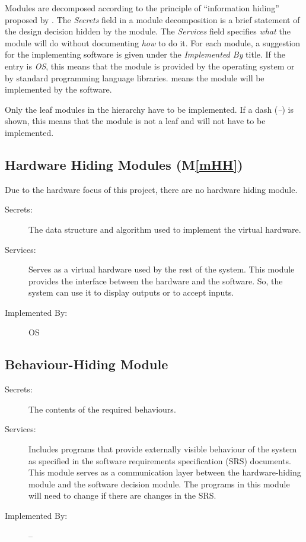 \documentclass[12pt, titlepage]{article}
\newcommand{\mref}[1]{M\ref{#1}}
\begin{document}
Modules are decomposed according to the principle of ``information hiding''
proposed by \citet{ParnasEtAl1984}. The \emph{Secrets} field in a module
decomposition is a brief statement of the design decision hidden by the
module. The \emph{Services} field specifies \emph{what} the module will do
without documenting \emph{how} to do it. For each module, a suggestion for the
implementing software is given under the \emph{Implemented By} title. If the
entry is \emph{OS}, this means that the module is provided by the operating
system or by standard programming language libraries.  \emph{\progname{}} means the
module will be implemented by the \progname{} software.

Only the leaf modules in the hierarchy have to be implemented. If a dash
(\emph{--}) is shown, this means that the module is not a leaf and will not have
to be implemented.

\subsection{Hardware Hiding Modules (\mref{mHH})}
Due to the hardware focus of this project, there are no hardware hiding module.
\begin{description}
\item[Secrets:]The data structure and algorithm used to implement the virtual
  hardware.
\item[Services:]Serves as a virtual hardware used by the rest of the
  system. This module provides the interface between the hardware and the
  software. So, the system can use it to display outputs or to accept inputs.
\item[Implemented By:] OS
\end{description}

\subsection{Behaviour-Hiding Module}

\begin{description}
\item[Secrets:]The contents of the required behaviours.
\item[Services:]Includes programs that provide externally visible behaviour of
  the system as specified in the software requirements specification (SRS)
  documents. This module serves as a communication layer between the
  hardware-hiding module and the software decision module. The programs in this
  module will need to change if there are changes in the SRS.
\item[Implemented By:] --
\end{description}
\end{document}
